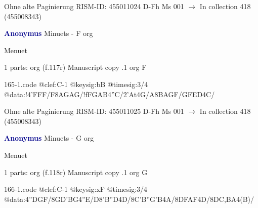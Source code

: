 \documentclass[twocolumn]{book}
\begin{document}
\newline Ohne alte Paginierung
\newline RISM-ID: 455011024
\newline D-Fh  Ms 001
\newline $\rightarrow$ In collection 418 (455008343)
      
\newline \par \vspace{7pt} \textcolor{darkblue}{\textbf{Anonymus  }}
\newline Minuets - F
\newline org
\newline \begin{itshape}[f.117r, heading:] Menuet\end{itshape} 
\newline \textcolor{darkblue}{}  1 parts: org  (f.117r)
\newline Manuscript copy
.1  org  F  
\begin{filecontents*}{165-1.code}
@clef:C-1
@keysig:bB
@timesig:3/4
@data:!4'FFF/F{8AGAG}/!f{FGAB}4''C/2'At4G/A{8BAGF}/{GFED}4C/
\end{filecontents*}
\newline
%

\newline Ohne alte Paginierung
\newline RISM-ID: 455011025
\newline D-Fh  Ms 001
\newline $\rightarrow$ In collection 418 (455008343)
      
\newline \par \vspace{7pt} \textcolor{darkblue}{\textbf{Anonymus  }}
\newline Minuets - G
\newline org
\newline \begin{itshape}[f.118r, heading:] Menuet\end{itshape} 
\newline \textcolor{darkblue}{}  1 parts: org  (f.118r)
\newline Manuscript copy
.1  org  G  
\begin{filecontents*}{166-1.code}
@clef:C-1
@keysig:xF
@timesig:3/4
@data:4''DGF/{8GD'BG}4''E/D{8'B''D}4D/{8C'B''G'B}4A/{8DF}{AF}4D/{8DC,BA}4(B)/
\end{filecontents*}
\newline
%
\end{document}

